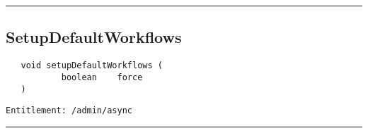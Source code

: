 \rule{12cm}{2pt}
\subsection{SetupDefaultWorkflows}
\label{Api:SetupDefaultWorkflows}
\begin{verbatim}
   void setupDefaultWorkflows (
           boolean    force
   )
\end{verbatim}
\begin{Verbatim}[fontsize=\small, formatcom=\color{Maroon}]
  Entitlement: /admin/async
\end{Verbatim}



\rule{12cm}{2pt}
